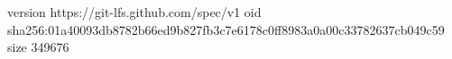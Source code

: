 version https://git-lfs.github.com/spec/v1
oid sha256:01a40093db8782b66ed9b827fb3c7e6178c0ff8983a0a00c33782637cb049c59
size 349676

